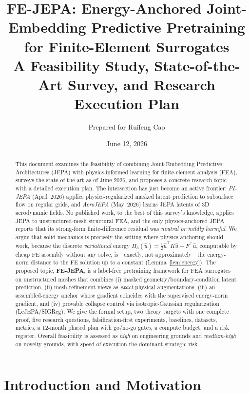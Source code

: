 \documentclass[11pt]{article}
\title{\textbf{FE-JEPA: Energy-Anchored Joint-Embedding Predictive Pretraining
for Finite-Element Surrogates}\\[1ex]
\large A Feasibility Study, State-of-the-Art Survey, and Research Execution Plan}
\author{Prepared for Ruifeng Cao}
\date{June 12, 2026}
\begin{document}
\maketitle

\begin{abstract}
\noindent
This document examines the feasibility of combining Joint-Embedding Predictive
Architectures (JEPA) with physics-informed learning for finite-element analysis
(FEA), surveys the state of the art as of June 2026, and proposes a concrete
research topic with a detailed execution plan. The intersection has just become
an active frontier: \emph{PI-JEPA} (April~2026) applies physics-regularized
masked latent prediction to subsurface flow on regular grids, and
\emph{AeroJEPA} (May~2026) learns JEPA latents of 3D aerodynamic fields.
No published work, to the best of this survey's knowledge, applies JEPA to
unstructured-mesh structural FEA, and the only physics-anchored JEPA reports
that its strong-form finite-difference residual was \emph{neutral or mildly
harmful}. We argue that solid mechanics is precisely the setting where physics
anchoring should work, because the discrete \emph{variational} energy
$\Pi_h(\hat u)=\tfrac12\hat u^\top K\hat u - F^\top\hat u$, computable by cheap
FE assembly without any solve, is---exactly, not approximately---the
energy-norm distance to the FE solution up to a constant
(Lemma~\ref{lem:energy}). The proposed topic, \textbf{FE-JEPA}, is a label-free
pretraining framework for FEA surrogates on unstructured meshes that combines
(i) masked geometry/boundary-condition latent prediction, (ii) mesh-refinement
views as \emph{exact} physical augmentations, (iii) an assembled-energy anchor
whose gradient coincides with the supervised energy-norm gradient, and (iv)
provable collapse control via isotropic-Gaussian regularization (LeJEPA/SIGReg).
We give the formal setup, two theory targets with one complete proof, five
research questions, falsification-first experiments, baselines, datasets,
metrics, a 12-month phased plan with go/no-go gates, a compute budget, and a
risk register. Overall feasibility is assessed as \emph{high} on engineering
grounds and \emph{medium-high} on novelty grounds, with speed of execution the
dominant strategic risk.
\end{abstract}

\tableofcontents
\bigskip

\section{Introduction and Motivation}
\label{sec:intro}
\end{document}

